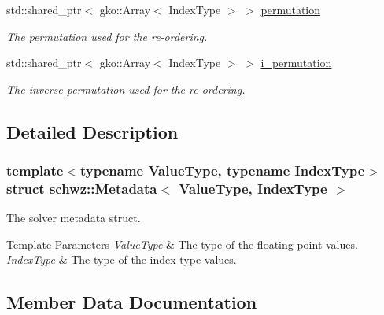 \begin{DoxyCompactItemize}
\mbox{\label{structschwz_1_1Metadata_af7361fcd600b3051619ce6e40770febc}} 
std\+::shared\+\_\+ptr$<$ gko\+::\+Array$<$ Index\+Type $>$ $>$ \hyperlink{structschwz_1_1Metadata_af7361fcd600b3051619ce6e40770febc}{permutation}
\begin{DoxyCompactList}\small\item\em The permutation used for the re-\/ordering. \end{DoxyCompactList}\item 
\mbox{\label{structschwz_1_1Metadata_a9ede19ac4f54b4161bed0a39bf7f5767}} 
std\+::shared\+\_\+ptr$<$ gko\+::\+Array$<$ Index\+Type $>$ $>$ \hyperlink{structschwz_1_1Metadata_a9ede19ac4f54b4161bed0a39bf7f5767}{i\+\_\+permutation}
\begin{DoxyCompactList}\small\item\em The inverse permutation used for the re-\/ordering. \end{DoxyCompactList}\end{DoxyCompactItemize}


\subsection{Detailed Description}
\subsubsection*{template$<$typename Value\+Type, typename Index\+Type$>$\newline
struct schwz\+::\+Metadata$<$ Value\+Type, Index\+Type $>$}

The solver metadata struct. 


\begin{DoxyTemplParams}{Template Parameters}
{\em Value\+Type} & The type of the floating point values. \\
\hline
{\em Index\+Type} & The type of the index type values. \\
\hline
\end{DoxyTemplParams}


\subsection{Member Data Documentation}
\mbox{\label{structschwz_1_1Metadata_a0fec5924fa99f07cabf560cc461887b5}} 
